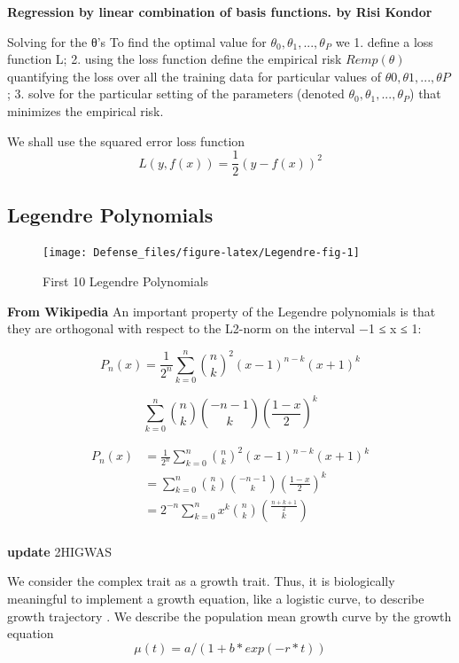 \documentclass[11pt,]{book}
\theoremstyle{definition}
\theoremstyle{definition}
\theoremstyle{remark}
\begin{document}
\textbf{Regression by linear combination of basis functions. by Risi
Kondor}

Solving for the θ's To find the optimal value for
\(θ_0, θ_1, . . . , θ_P\) we 1. define a loss function L; 2. using the
loss function define the empirical risk \(Remp(θ)\) quantifying the loss
over all the training data for particular values of
\(θ0, θ1, . . . , θP\) ; 3. solve for the particular setting of the
parameters (denoted \(θ_0, θ_1, . . . , θ_P\)) that minimizes the
empirical risk.

We shall use the squared error loss function
\[L(y, f(x)) =\frac{1}{2}(y − f(x))^2\]

\subsection{Legendre Polynomials}\label{legendre-polynomials}

\begin{figure}

{\centering \texttt{[image: Defense\_files/figure-latex/Legendre-fig-1]} 

}

\caption{First 10 Legendre Polynomials}\label{fig:Legendre-fig}
\end{figure}

\textbf{From Wikipedia} An important property of the Legendre
polynomials is that they are orthogonal with respect to the L2-norm on
the interval −1 ≤ x ≤ 1:

\[P_n(x) = \frac{1}{2^n}\sum_{k=0}^{n}{{n}\choose{k}}^2(x-1)^{n-k}(x+1)^k\]

\[\sum_{k=0}^{n}{{n}\choose{k}}{{-n-1}\choose{k}}{\left(\frac{1-x}{2}\right)}^k\]

\begin{equation}
\begin{split}
P_n(x) & = \frac{1}{2^n}\sum_{k=0}^{n}{{n}\choose{k}}^2(x-1)^{n-k}(x+1)^k \\
& = \sum_{k=0}^{n}{{n}\choose{k}}{{-n-1}\choose{k}}{\left(\frac{1-x}{2}\right)}^k \\
& = 2^{-n}\sum_{k=0}^{n} x^k {{n}\choose{k}}{{\frac{n+k+1}{2}}\choose{k}} \\
\end{split}
\label{eq:leg-eq}
\end{equation}

\textbf{update} 2HIGWAS \cite{jiang20152higwas}

We consider the complex trait as a growth trait. Thus, it is
biologically meaningful to implement a growth equation, like a logistic
curve, to describe growth trajectory \cite{west2001general}. We describe
the population mean growth curve by the growth equation
\[ \mu(t) = a/(1 + b * exp(-r*t)) \]
\end{document}
